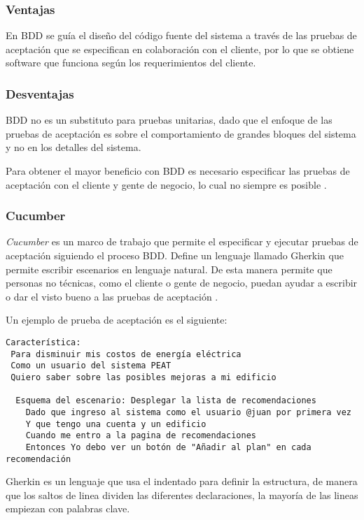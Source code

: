 \subsubsection{Ventajas}
En BDD se guía el diseño del código fuente del sistema a través de las pruebas
de aceptación que se especifican en colaboración con el cliente, por lo que
se obtiene software que funciona según los requerimientos del cliente.

\subsubsection{Desventajas}
BDD no es un substituto para pruebas unitarias, dado que el enfoque de
las pruebas de aceptación es sobre el comportamiento de grandes bloques
del sistema y no en los detalles del sistema.

Para obtener el mayor beneficio con BDD es necesario especificar las pruebas
de aceptación con el cliente y gente de negocio, lo cual no siempre es
posible \cite{12_rappin_2010}.

\subsubsection{Cucumber}
\textit{Cucumber} es un marco de trabajo que permite el especificar y ejecutar
pruebas de aceptación siguiendo el proceso BDD. Define un lenguaje llamado
Gherkin que permite escribir escenarios en lenguaje natural. De esta manera
permite que personas no técnicas, como el cliente o gente de negocio,
puedan ayudar a escribir o dar el visto bueno a las pruebas de aceptación
\cite{23_chelimsky_2010}.

\vspace{2.5mm}

Un ejemplo de prueba de aceptación es el siguiente:
\begin{verbatim}
Característica:
 Para disminuir mis costos de energía eléctrica
 Como un usuario del sistema PEAT
 Quiero saber sobre las posibles mejoras a mi edificio

  Esquema del escenario: Desplegar la lista de recomendaciones
    Dado que ingreso al sistema como el usuario @juan por primera vez
    Y que tengo una cuenta y un edificio
    Cuando me entro a la pagina de recomendaciones
    Entonces Yo debo ver un botón de "Añadir al plan" en cada recomendación
\end{verbatim}

Gherkin es un lenguaje que usa el indentado para definir la estructura, de manera
que los saltos de linea dividen las diferentes declaraciones,
la mayoría de las lineas empiezan con palabras clave.

